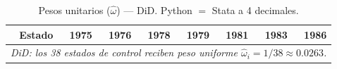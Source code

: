 \begin{table}[H]
\centering
\caption{Pesos unitarios ($\hat{\omega}$) --- DiD. Python $=$ Stata a 4 decimales.}
\label{tab:omega_did}
\small
\begin{tabular}{rrrrrrrr}
\toprule
Estado & 1975 & 1976 & 1978 & 1979 & 1981 & 1983 & 1986 \\
\midrule
\multicolumn{8}{c}{\textit{DiD: los 38 estados de control reciben peso uniforme $\hat{\omega}_i = 1/38 \approx 0.0263$.}} \\
\bottomrule
\end{tabular}
\end{table}